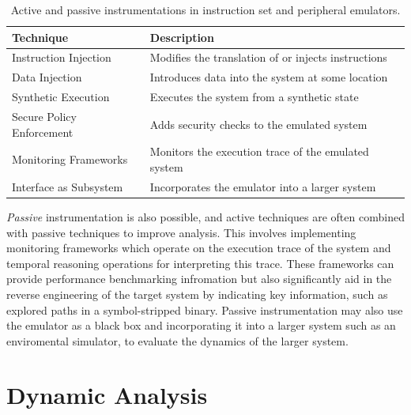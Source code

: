 \begin{table}[h]
\centering
\begin{tabular}{|l|l|}
\hline
\textbf{Technique} & \textbf{Description} \\ \hline
\multirow{2}{*}{Instruction Injection} & \multirow{2}{*}{Modifies the translation of or injects instructions} \\
 & \\ \hline
\multirow{2}{*}{Data Injection} & \multirow{2}{*}{Introduces data into the system at some location} \\
 & \\ \hline
\multirow{2}{*}{Synthetic Execution} & \multirow{2}{*}{Executes the system from a synthetic state} \\
 & \\ \hline
\multirow{2}{*}{Secure Policy Enforcement} & \multirow{2}{*}{Adds security checks to the emulated system} \\
 & \\ \hline
\multirow{2}{*}{Monitoring Frameworks} & \multirow{2}{*}{Monitors the execution trace of the emulated system} \\
 & \\ \hline
\multirow{2}{*}{Interface as Subsystem} & \multirow{2}{*}{Incorporates the emulator into a larger system} \\
 & \\ \hline
\end{tabular}
\caption{Active and passive instrumentations in instruction set and peripheral emulators.}
\label{tab:instruments}
\end{table}

\emph{Passive} instrumentation is also possible, and active techniques are often combined with passive techniques to improve analysis.
This involves implementing monitoring frameworks which operate on the execution trace of the system and temporal reasoning operations for interpreting this trace.
These frameworks can provide performance benchmarking infromation but also significantly aid in the reverse engineering of the target system by indicating key information, such as explored paths in a symbol-stripped binary.
Passive instrumentation may also use the emulator as a black box and incorporating it into a larger system such as an enviromental simulator, to evaluate the dynamics of the larger system.

\section{Dynamic Analysis}
\label{sec:dynanal}

